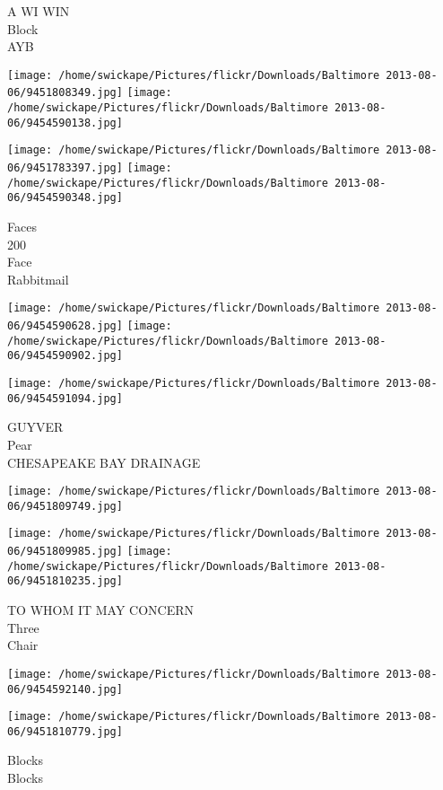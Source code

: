 \documentclass[10pt,letterpaper]{article}
\begin{document}
A WI WIN\\
Block\\
AYB
\pagebreak

\texttt{[image: /home/swickape/Pictures/flickr/Downloads/Baltimore 2013-08-06/9451808349.jpg]}
\texttt{[image: /home/swickape/Pictures/flickr/Downloads/Baltimore 2013-08-06/9454590138.jpg]}

\texttt{[image: /home/swickape/Pictures/flickr/Downloads/Baltimore 2013-08-06/9451783397.jpg]}
\texttt{[image: /home/swickape/Pictures/flickr/Downloads/Baltimore 2013-08-06/9454590348.jpg]}

Faces\\
200\\
Face\\
Rabbitmail
\pagebreak

\texttt{[image: /home/swickape/Pictures/flickr/Downloads/Baltimore 2013-08-06/9454590628.jpg]}
\texttt{[image: /home/swickape/Pictures/flickr/Downloads/Baltimore 2013-08-06/9454590902.jpg]}

\vspace{0.25in}
\texttt{[image: /home/swickape/Pictures/flickr/Downloads/Baltimore 2013-08-06/9454591094.jpg]}

GUYVER\\
Pear\\
CHESAPEAKE BAY DRAINAGE
\pagebreak

\texttt{[image: /home/swickape/Pictures/flickr/Downloads/Baltimore 2013-08-06/9451809749.jpg]}

\vspace{0.25in}
\texttt{[image: /home/swickape/Pictures/flickr/Downloads/Baltimore 2013-08-06/9451809985.jpg]}
\texttt{[image: /home/swickape/Pictures/flickr/Downloads/Baltimore 2013-08-06/9451810235.jpg]}

TO WHOM IT MAY CONCERN\\
Three\\
Chair
\pagebreak

\texttt{[image: /home/swickape/Pictures/flickr/Downloads/Baltimore 2013-08-06/9454592140.jpg]}

\vspace{0.25in}
\texttt{[image: /home/swickape/Pictures/flickr/Downloads/Baltimore 2013-08-06/9451810779.jpg]}

Blocks\\
Blocks
\pagebreak
\end{document}
